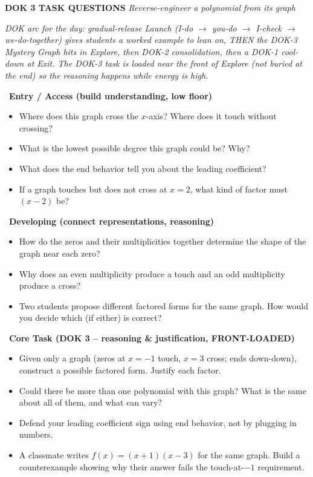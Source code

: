 \documentclass[11pt]{article}
\begin{document}
\textbf{DOK 3 TASK QUESTIONS} \hfill \textit{Reverse-engineer a polynomial from its graph}

\vspace{0.5em}
\noindent\textit{DOK arc for the day: gradual-release Launch (I-do $\rightarrow$ you-do $\rightarrow$ I-check $\rightarrow$ we-do-together) gives students a worked example to lean on, THEN the DOK-3 Mystery Graph hits in Explore, then DOK-2 consolidation, then a DOK-1 cool-down at Exit. The DOK-3 task is loaded near the front of Explore (not buried at the end) so the reasoning happens while energy is high.}

\vspace{1em}

\noindent \textbullet \ \textbf{Entry / Access (build understanding, low floor)}
\begin{itemize}[label=$\bullet$, leftmargin=0.5in]
    \item Where does this graph cross the $x$-axis? Where does it touch without crossing?
    \item What is the lowest possible degree this graph could be? Why?
    \item What does the end behavior tell you about the leading coefficient?
    \item If a graph touches but does not cross at $x=2$, what kind of factor must $(x-2)$ be?
\end{itemize}

\vspace{1em}

\noindent \textbullet \ \textbf{Developing (connect representations, reasoning)}
\begin{itemize}[label=$\bullet$, leftmargin=0.5in]
    \item How do the zeros and their multiplicities together determine the shape of the graph near each zero?
    \item Why does an even multiplicity produce a touch and an odd multiplicity produce a cross?
    \item Two students propose different factored forms for the same graph. How would you decide which (if either) is correct?
\end{itemize}

\vspace{1em}

\noindent \textbullet \ \textbf{Core Task (DOK 3 -- reasoning \& justification, FRONT-LOADED)}
\begin{itemize}[label=$\bullet$, leftmargin=0.5in]
    \item Given only a graph (zeros at $x=-1$ touch, $x=3$ cross; ends down-down), construct a possible factored form. Justify each factor.
    \item Could there be more than one polynomial with this graph? What is the same about all of them, and what can vary?
    \item Defend your leading coefficient sign using end behavior, not by plugging in numbers.
    \item A classmate writes $f(x) = (x+1)(x-3)$ for the same graph. Build a counterexample showing why their answer fails the touch-at-$-1$ requirement.
\end{itemize}
\end{document}
